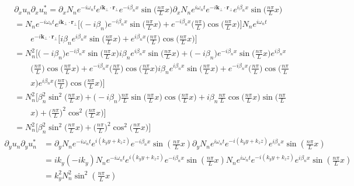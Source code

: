 \documentclass[english]{article}
\begin{document}
\begin{align*}
 & \partial_{x}u_{n}\partial_{x}u^{*}_{n}=\partial_{x}N_{n}e^{-i\omega_{n}t}e^{i\boldsymbol{k}_{\bot}\cdot\boldsymbol{r}_{\bot}}e^{-i\beta_{n}x}\sin\biggl(\frac{n\pi}{L}x\biggr)\partial_{x}N_{n}e^{i\omega_{n}t}e^{-i\boldsymbol{k}_{\bot}\cdot\boldsymbol{r}_{\bot}}e^{i\beta_{n}x}\sin\biggl(\frac{n\pi}{L}x\biggr)\\
 & =N_{n}e^{-i\omega_{n}t}e^{i\boldsymbol{k}_{\bot}\cdot\boldsymbol{r}_{\bot}}\biggl[\biggl(-i\beta_{n}\biggr)e^{-i\beta_{n}x}\sin\biggl(\frac{n\pi}{L}x\biggr)+e^{-i\beta_{n}x}\biggl(\frac{n\pi}{L}\biggr)\cos\biggl(\frac{n\pi}{L}x\biggr)\biggr]N_{n}e^{i\omega_{n}t}\\
 & \qquad e^{-i\boldsymbol{k}_{\bot}\cdot\boldsymbol{r}_{\bot}}\biggl[i\beta_{n}e^{i\beta_{n}x}\sin\biggl(\frac{n\pi}{L}x\biggr)+e^{i\beta_{n}x}\biggl(\frac{n\pi}{L}\biggr)\cos\biggl(\frac{n\pi}{L}x\biggr)\biggr]\\
 & =N^{2}_{n}\biggl[\biggl(-i\beta_{n}\biggr)e^{-i\beta_{n}x}\sin\biggl(\frac{n\pi}{L}x\biggr)i\beta_{n}e^{i\beta_{n}x}\sin\biggl(\frac{n\pi}{L}x\biggr)+\biggl(-i\beta_{n}\biggr)e^{-i\beta_{n}x}\sin\biggl(\frac{n\pi}{L}x\biggr)e^{i\beta_{n}x}\\
 & \qquad\biggl(\frac{n\pi}{L}\biggr)\cos\biggl(\frac{n\pi}{L}x\biggr)+e^{-i\beta_{n}x}\biggl(\frac{n\pi}{L}\biggr)\cos\biggl(\frac{n\pi}{L}x\biggr)i\beta_{n}e^{i\beta_{n}x}\sin\biggl(\frac{n\pi}{L}x\biggr)+e^{-i\beta_{n}x}\biggl(\frac{n\pi}{L}\biggr)\cos\biggl(\frac{n\pi}{L}\\
 & \qquad x\biggr)e^{i\beta_{n}x}\biggl(\frac{n\pi}{L}\biggr)\cos\biggl(\frac{n\pi}{L}x\biggr)\biggr]\\
 & =N^{2}_{n}\biggl[\beta^{2}_{n}\sin^{2}\biggl(\frac{n\pi}{L}x\biggr)+\biggl(-i\beta_{n}\biggr)\frac{n\pi}{L}\sin\biggl(\frac{n\pi}{L}x\biggr)\cos\biggl(\frac{n\pi}{L}x\biggr)+i\beta_{n}\frac{n\pi}{L}\cos\biggl(\frac{n\pi}{L}x\biggr)\sin\biggl(\frac{n\pi}{L}\\
 & \qquad x\biggr)+\biggl(\frac{n\pi}{L}\biggr)^{2}\cos^{2}\biggl(\frac{n\pi}{L}x\biggr)\biggr]\\
 & =N^{2}_{n}\biggl[\beta^{2}_{n}\sin^{2}\biggl(\frac{n\pi}{L}x\biggr)+\biggl(\frac{n\pi}{L}\biggr)^{2}\cos^{2}\biggl(\frac{n\pi}{L}x\biggr)\biggr]
\end{align*}
 {}
\begin{align*}
\partial_{y}u_{n}\partial_{y}u^{*}_{n} & =\partial_{y}N_{n}e^{-i\omega_{n}t}e^{i\left(k_{y}y+k_{z}z\right)}e^{-i\beta_{n}x}\sin\left(\frac{n\pi}{L}x\right)\partial_{y}N_{n}e^{i\omega_{n}t}e^{-i\left(k_{y}y+k_{z}z\right)}e^{i\beta_{n}x}\sin\left(\frac{n\pi}{L}x\right)\\
 & =ik_{y}\left(-ik_{y}\right)N_{n}e^{-i\omega_{n}t}e^{i\left(k_{y}y+k_{z}z\right)}e^{-i\beta_{n}x}\sin\left(\frac{n\pi}{L}x\right)N_{n}e^{i\omega_{n}t}e^{-i\left(k_{y}y+k_{z}z\right)}e^{i\beta_{n}x}\sin\left(\frac{n\pi}{L}x\right)\\
 & =k^{2}_{y}N^{2}_{n}\sin^{2}\left(\frac{n\pi}{L}x\right)
\end{align*}
\end{document}
